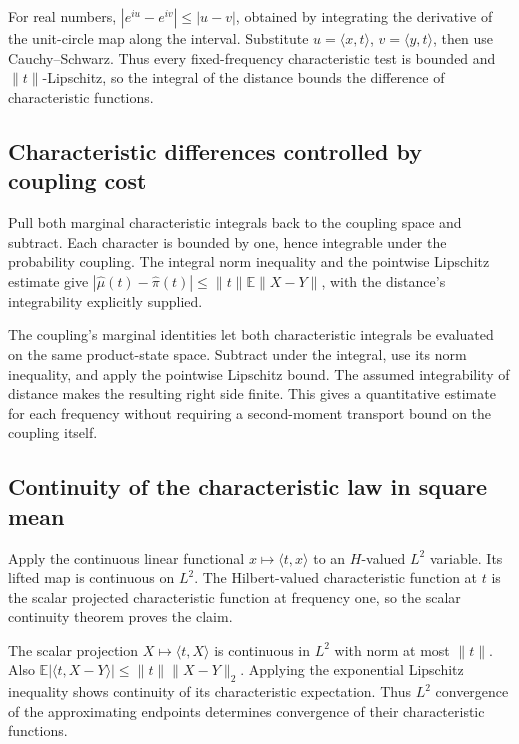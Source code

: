 \documentclass[11pt,a4paper]{article}
\begin{document}
For real numbers, \(|e^{iu}-e^{iv}|\le|u-v|\), obtained by integrating the derivative of the unit-circle map along the interval. Substitute \(u=\langle x,t\rangle\), \(v=\langle y,t\rangle\), then use Cauchy–Schwarz. Thus every fixed-frequency characteristic test is bounded and \(\|t\|\)-Lipschitz, so the integral of the distance bounds the difference of characteristic functions.


\subsection{\texorpdfstring{Characteristic differences controlled by coupling cost}{Characteristic differences controlled by coupling cost}}


Pull both marginal characteristic integrals back to the coupling space and subtract. Each character is bounded by one, hence integrable under the probability coupling. The integral norm inequality and the pointwise Lipschitz estimate give \(|\widehat\mu(t)-\widehat\pi(t)|\le\|t\|\mathbb E\|X-Y\|\), with the distance's integrability explicitly supplied.



The coupling's marginal identities let both characteristic integrals be evaluated on the same product-state space. Subtract under the integral, use its norm inequality, and apply the pointwise Lipschitz bound. The assumed integrability of distance makes the resulting right side finite. This gives a quantitative estimate for each frequency without requiring a second-moment transport bound on the coupling itself.


\subsection{\texorpdfstring{Continuity of the characteristic law in square mean}{Continuity of the characteristic law in square mean}}


Apply the continuous linear functional \(x\mapsto\langle t,x\rangle\) to an \(H\)-valued \(L^2\) variable. Its lifted map is continuous on \(L^2\). The Hilbert-valued characteristic function at \(t\) is the scalar projected characteristic function at frequency one, so the scalar continuity theorem proves the claim.



The scalar projection \(X\mapsto\langle t,X\rangle\) is continuous in \(L^2\) with norm at most \(\|t\|\). Also \(\mathbb E|\langle t,X-Y\rangle|\le\|t\|\|X-Y\|_2\). Applying the exponential Lipschitz inequality shows continuity of its characteristic expectation. Thus \(L^2\) convergence of the approximating endpoints determines convergence of their characteristic functions.
\end{document}
